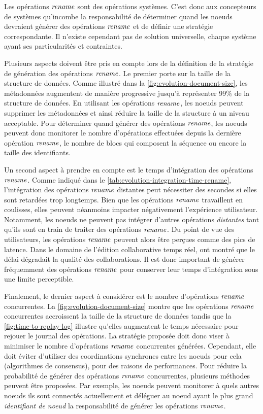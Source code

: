 Les opérations $\mathit{rename}$ sont des opérations systèmes.
C'est donc aux concepteurs de systèmes qu'incombe la responsabilité de déterminer quand les noeuds devraient générer des opérations $\mathit{rename}$ et de définir une stratégie correspondante.
Il n'existe cependant pas de solution universelle, chaque système ayant ses particularités et contraintes.

Plusieurs aspects doivent être pris en compte lors de la définition de la stratégie de génération des opérations $\mathit{rename}$.
Le premier porte sur la taille de la structure de données.
Comme illustré dans la \autoref{fig:evolution-document-size}, les métadonnées augmentent de manière progressive jusqu'à représenter 99\% de la structure de données.
En utilisant les opérations $\mathit{rename}$, les noeuds peuvent supprimer les métadonnées et ainsi réduire la taille de la structure à un niveau acceptable.
Pour déterminer quand générer des opérations $\mathit{rename}$, les noeuds peuvent donc monitorer le nombre d'opérations effectuées depuis la dernière opération $\mathit{rename}$, le nombre de blocs qui composent la séquence ou encore la taille des identifiants.

Un second aspect à prendre en compte est le temps d'intégration des opérations $\mathit{rename}$.
Comme indiqué dans le \autoref{tab:evolution-integration-time-rename}, l'intégration des opérations $\mathit{rename}$ distantes peut nécessiter des secondes si elles sont retardées trop longtemps.
Bien que les opérations $\mathit{rename}$ travaillent en coulisses, elles peuvent néanmoins impacter négativement l'expérience utilisateur.
Notamment, les noeuds ne peuvent pas intégrer d'autres opérations \emph{distantes} tant qu'ils sont en train de traiter des opérations $\mathit{rename}$.
Du point de vue des utilisateurs, les opérations $\mathit{rename}$ peuvent alors être perçues comme des pics de latence.
Dans le domaine de l'édition collaborative temps réel, \textcite{2014-effect-delay-collaborative-editing-ignat,2015-cope-delay-collaborative-note-taking-ignat} ont montré que le délai dégradait la qualité des collaborations.
Il est donc important de générer fréquemment des opérations $\mathit{rename}$ pour conserver leur temps d'intégration sous une limite perceptible.

Finalement, le dernier aspect à considérer est le nombre d'opérations $\mathit{rename}$ concurrentes.
La \autoref{fig:evolution-document-size} montre que les opérations $\mathit{rename}$ concurrentes accroissent la taille de la structure de données tandis que la \autoref{fig:time-to-replay-log} illustre qu'elles augmentent le temps nécessaire pour rejouer le journal des opérations.
La stratégie proposée doit donc viser à minimiser le nombre d'opérations $\mathit{rename}$ concurrentes générées.
Cependant, elle doit éviter d'utiliser des coordinations synchrones entre les noeuds pour cela (\eg algorithmes de consensus), pour des raisons de performances.
Pour réduire la probabilité de générer des opérations $\mathit{rename}$ concurrentes, plusieurs méthodes peuvent être proposées.
Par exemple, les noeuds peuvent monitorer à quels autres noeuds ils sont connectés actuellement et déléguer au noeud ayant le plus grand \emph{identifiant de noeud} la responsabilité de générer les opérations $\mathit{rename}$.

